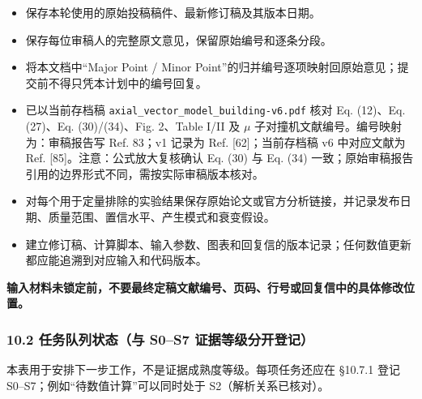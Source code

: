 \documentclass[
  chinese,
  UTF8]{ctexart}
\providecommand{\tightlist}{%
  \setlength{\itemsep}{0pt}\setlength{\parskip}{0pt}}
\begin{document}
\begin{itemize}
\tightlist
\item[$\square$]
  保存本轮使用的原始投稿稿件、最新修订稿及其版本日期。
\item[$\square$]
  保存每位审稿人的完整原文意见，保留原始编号和逐条分段。
\item[$\square$]
  将本文档中``Major Point / Minor
  Point''的归并编号逐项映射回原始意见；提交前不得只凭本计划中的编号回复。
\item[$\boxtimes$]
  已以当前存档稿 \texttt{axial\_vector\_model\_building-v6.pdf} 核对 Eq.
  (12)、Eq. (27)、Eq. (30)/(34)、Fig. 2、Table I/II 及 \ensuremath{\mu}
  子对撞机文献编号。编号映射为：审稿报告写 Ref. 83；v1 记录为 Ref.
  {[}62{]}；当前存档稿 v6 中对应文献为 Ref.
  {[}85{]}。注意：公式放大复核确认 Eq. (30) 与 Eq. (34)
  一致；原始审稿报告引用的边界形式不同，需按实际审稿版本核对。
\item[$\square$]
  对每个用于定量排除的实验结果保存原始论文或官方分析链接，并记录发布日期、质量范围、置信水平、产生模式和衰变假设。
\item[$\square$]
  建立修订稿、计算脚本、输入参数、图表和回复信的版本记录；任何数值更新都应能追溯到对应输入和代码版本。
\end{itemize}

\textbf{输入材料未锁定前，不要最终定稿文献编号、页码、行号或回复信中的具体修改位置。}

\subsubsection{10.2 任务队列状态（与 S0--S7
证据等级分开登记）}\label{ux4efbux52a1ux961fux5217ux72b6ux6001ux4e0e-s0s7-ux8bc1ux636eux7b49ux7ea7ux5206ux5f00ux767bux8bb0}

本表用于安排下一步工作，不是证据成熟度等级。每项任务还应在 §10.7.1 登记
S0--S7；例如``待数值计算''可以同时处于 S2（解析关系已核对）。
\end{document}
